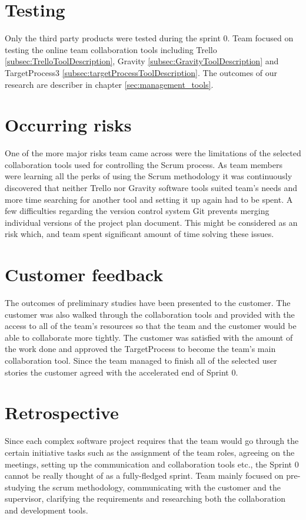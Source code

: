 \section{Testing}

Only the third party products were tested during the sprint 0. Team focused on testing the online team collaboration tools including Trello \ref{subsec:TrelloToolDescription}, Gravity \ref{subsec:GravityToolDescription} and TargetProcess3 \ref{subsec:targetProcessToolDescription}. The outcomes of our research are describer in chapter \ref{sec:management_tools}.

\section{Occurring risks}

One of the more major risks team came across were the limitations of the selected collaboration tools used for controlling the Scrum process. As team members were learning all the perks of using the Scrum methodology it was continuously discovered that neither Trello nor Gravity software tools suited team's needs and more time searching for another tool and setting it up again had to be spent. A few difficulties regarding the version control system Git prevents merging individual versions of the project plan document. This might be considered as an risk which, and team spent significant amount of time solving these issues.

\section{Customer feedback}

The outcomes of preliminary studies have been presented to the customer. The customer was also walked through the collaboration tools and provided with the access to all of the team's resources so that the team and the customer would be able to collaborate more tightly. The customer was satisfied with the amount of the work done and approved the TargetProcess to become the team's main collaboration tool. Since the team managed to finish all of the selected user stories the customer agreed with the accelerated end of Sprint 0.

\section{Retrospective}
Since each complex software project requires that the team would go through the certain initiative tasks such as the assignment of the team roles, agreeing on the meetings, setting up the communication and collaboration tools etc., the Sprint 0 cannot be really thought of as a fully-fledged sprint. Team mainly focused on pre-studying the scrum methodology, communicating with the customer and the supervisor, clarifying the requirements and researching both the collaboration and development tools.

